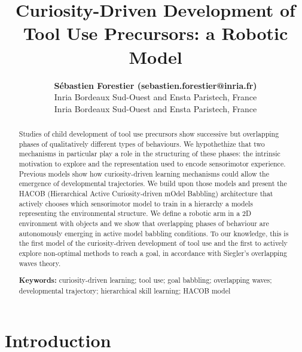 \documentclass[10pt,letterpaper]{article}
\title{Curiosity-Driven Development of Tool Use Precursors: a Robotic Model}
\author{{\large \bf S\'ebastien Forestier (sebastien.forestier@inria.fr)} \\
	Inria Bordeaux Sud-Ouest and Ensta Paristech, France
  \AND {\large \bf Pierre-Yves Oudeyer (pierre-yves.oudeyer@inria.fr)} \\
	Inria Bordeaux Sud-Ouest and Ensta Paristech, France}
\begin{document}
\maketitle


\begin{abstract}
Studies of child development of tool use precursors show successive but overlapping phases of qualitatively different types of behaviours.
We hypothethize that two mechanisms in particular play a role in the structuring of these phases: the intrinsic motivation to explore and the representation used to encode sensorimotor experience.
Previous models show how curiosity-driven learning mechanisms could allow the emergence of developmental trajectories.
We build upon those models and present the HACOB (Hierarchical Active Curiosity-driven mOdel Babbling) architecture 
that actively chooses which sensorimotor model to train in a hierarchy a models representing the environmental structure.
We define a robotic arm in a $2$D environment with objects and we show that overlapping phases of behaviour are autonomously emerging in active model babbling conditions.
To our knowledge, this is the first model of the curiosity-driven development of tool use and the first to actively explore non-optimal methods to reach a goal, in accordance with Siegler's overlapping waves theory.



\textbf{Keywords:} 
curiosity-driven learning; tool use; goal babbling; overlapping waves; developmental trajectory; hierarchical skill learning; HACOB model
\end{abstract}


\section{Introduction}
\end{document}
